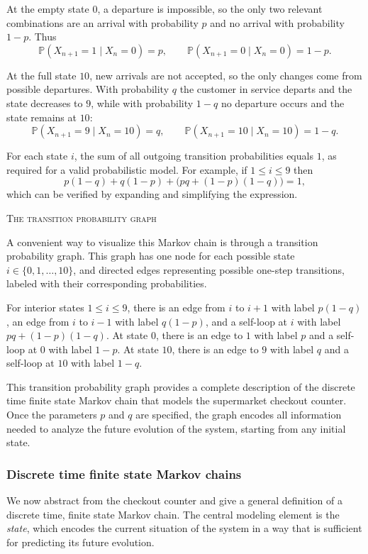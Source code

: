 At the empty state \(0\), a departure is impossible, so the only two relevant combinations are an arrival with probability \(p\) and no arrival with probability \(1-p\).
Thus
\[
\mathbb{P}(X_{n+1} = 1 \mid X_n = 0)
=
p,
\qquad
\mathbb{P}(X_{n+1} = 0 \mid X_n = 0)
=
1-p.
\]

At the full state \(10\), new arrivals are not accepted, so the only changes come from possible departures.
With probability \(q\) the customer in service departs and the state decreases to \(9\), while with probability \(1-q\) no departure occurs and the state remains at \(10\):
\[
\mathbb{P}(X_{n+1} = 9 \mid X_n = 10)
=
q,
\qquad
\mathbb{P}(X_{n+1} = 10 \mid X_n = 10)
=
1-q.
\]

For each state \(i\), the sum of all outgoing transition probabilities equals \(1\), as required for a valid probabilistic model.
For example, if \(1 \le i \le 9\) then
\[
p(1-q) + q(1-p) + \big(p q + (1-p)(1-q)\big) = 1,
\]
which can be verified by expanding and simplifying the expression.

\bigskip
\textsc{The transition probability graph}

A convenient way to visualize this Markov chain is through a transition probability graph.
This graph has one node for each possible state \(i \in \{0,1,\dots,10\}\), and directed edges representing possible one-step transitions, labeled with their corresponding probabilities.

For interior states \(1 \le i \le 9\), there is an edge from \(i\) to \(i+1\) with label \(p(1-q)\), an edge from \(i\) to \(i-1\) with label \(q(1-p)\), and a self-loop at \(i\) with label \(p q + (1-p)(1-q)\).
At state \(0\), there is an edge to \(1\) with label \(p\) and a self-loop at \(0\) with label \(1-p\).
At state \(10\), there is an edge to \(9\) with label \(q\) and a self-loop at \(10\) with label \(1-q\).

This transition probability graph provides a complete description of the discrete time finite state Markov chain that models the supermarket checkout counter.
Once the parameters \(p\) and \(q\) are specified, the graph encodes all information needed to analyze the future evolution of the system, starting from any initial state.


\subsubsection{Discrete time finite state Markov chains}

We now abstract from the checkout counter and give a general definition of a discrete time, finite state Markov chain.
The central modeling element is the \textit{state}, which encodes the current situation of the system in a way that is sufficient for predicting its future evolution.


